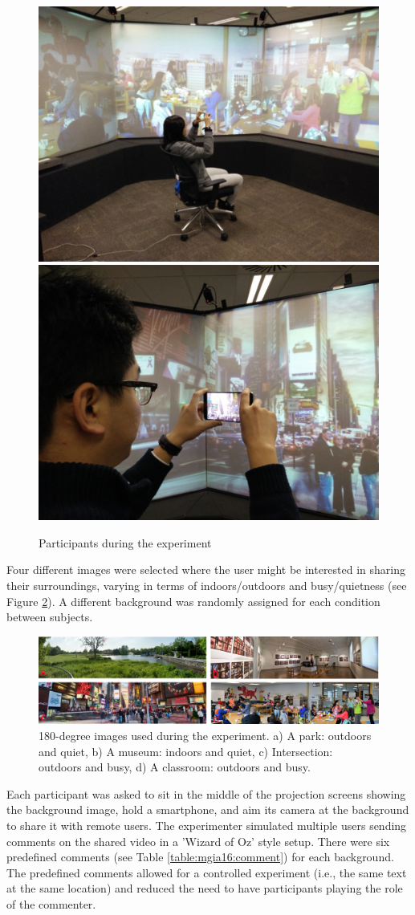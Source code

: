\begin{figure}[h]
  \centering
  \includegraphics[width=0.45\linewidth]{images/61-video-mgia16/participant1}
  \includegraphics[width=0.45\linewidth]{images/61-video-mgia16/participant2}
  \caption{Participants during the experiment}
    \label{fig:mgia16:participant}
\end{figure}

Four different images were selected where the user might be interested in sharing their surroundings, varying in terms of indoors/outdoors and busy/quietness (see Figure \ref{fig:mgia16:backgrounds}). A different background was randomly assigned for each condition between subjects. 

\begin{figure}[h]
  \centering
  \includegraphics[width=\linewidth]{images/61-video-mgia16/backgrounds-legend.png}
  \caption{180-degree images used during the experiment. a) A park: outdoors and quiet, b) A museum: indoors and quiet, c) Intersection: outdoors and busy, d) A classroom: outdoors and busy.}
    \label{fig:mgia16:backgrounds}
\end{figure}

Each participant was asked to sit in the middle of the projection screens showing the background image, hold a smartphone, and aim its camera at the background to share it with remote users. The experimenter simulated multiple users sending comments on the shared video in a 'Wizard of Oz' style setup. There were six predefined comments (see Table \ref{table:mgia16:comment}) for each background. The predefined comments allowed for a controlled experiment (i.e., the same text at the same location) and reduced the need to have participants playing the role of the commenter. 

